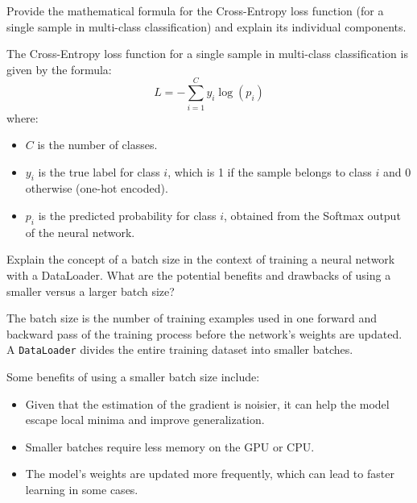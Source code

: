 \begin{ejercicio}
    Provide the mathematical formula for the Cross-Entropy loss function (for a single sample in multi-class classification) and explain its individual components.

    The Cross-Entropy loss function for a single sample in multi-class classification is given by the formula:
\[
L = -\sum_{i=1}^{C} y_i \log(p_i)
\]
where:
\begin{itemize}
    \item $C$ is the number of classes.
    \item $y_i$ is the true label for class $i$, which is 1 if the sample belongs to class $i$ and 0 otherwise (one-hot encoded).
    \item $p_i$ is the predicted probability for class $i$, obtained from the Softmax output of the neural network.
\end{itemize}
\end{ejercicio}


\begin{ejercicio}[Bonus]
    Explain the concept of a batch size in the context of training a neural network with a DataLoader. What are the potential benefits and drawbacks of using a smaller versus a larger batch size?
    

    The batch size is the number of training examples used in one forward and backward pass of the training process before the network's weights are updated. A \texttt{DataLoader} divides the entire training dataset into smaller batches.

    Some benefits of using a smaller batch size include:
    \begin{itemize}
        \item Given that the estimation of the gradient is noisier, it can help the model escape local minima and improve generalization.
        \item Smaller batches require less memory on the GPU or CPU.
        \item The model's weights are updated more frequently, which can lead to faster learning in some cases.
    \end{itemize}
\end{ejercicio}

